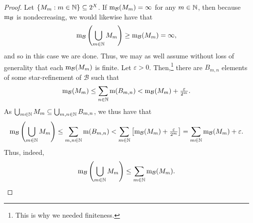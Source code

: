 \begin{thm}
\begin{savenotes}
\begin{proof}
Let $\{ M_m:m\in \mathbb{N} \} \subseteq 2^X$.  If $\mathrm{m} _{\mathcal{B}}(M_m)=\infty$ for any $m\in \mathbb{N}$, then because $\mathrm{m} _{\mathcal{B}}$ is nondecreasing, we would likewise have that
\begin{equation}
\mathrm{m} _{\mathcal{B}}\left( \bigcup _{m\in \mathbb{N}}M_m\right) \geq \mathrm{m} _{\mathcal{B}}(M_m)=\infty ,
\end{equation}
and so in this case we are done.  Thus, we may as well assume without loss of generality that each $\mathrm{m} _{\mathcal{B}}(M_m)$ is finite.  Let $\varepsilon >0$.  Then,\footnote{This is why we needed finiteness.} there are $B_{m,n}$ elements of some star-refinement of $\mathcal{B}$ such that
\begin{equation}
\mathrm{m} _{\mathcal{B}}(M_m)\leq \sum _{n\in \mathbb{N}}\mathrm{m} (B_{m,n})<\mathrm{m} _{\mathcal{B}}(M_m)+\tfrac{\varepsilon}{2^m}.
\end{equation}
As $\bigcup _{m\in \mathbb{N}}M_m\subseteq \bigcup _{m,n\in \mathbb{N}}B_{m,n}$, we thus have that
\begin{equation}
\mathrm{m} _{\mathcal{B}}\left( \bigcup _{m\in \mathbb{N}}M_m\right) \leq \sum _{m,n\in \mathbb{N}}\mathrm{m} (B_{m,n})<\sum _{m\in \mathbb{N}}\left[ \mathrm{m} _{\mathcal{B}}(M_m)+\tfrac{\varepsilon}{2^m}\right] =\sum _{m\in \mathbb{N}}\mathrm{m} _{\mathcal{B}}(M_m)+\varepsilon .
\end{equation}
Thus, indeed,
\begin{equation}
\mathrm{m} _{\mathcal{B}}\left( \bigcup _{m\in \mathbb{N}}M_m\right) \leq \sum _{m\in \mathbb{N}}\mathrm{m} _{\mathcal{B}}(M_m).
\end{equation}
\end{proof}
\end{savenotes}
\end{thm}

